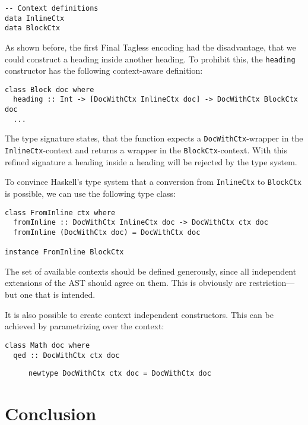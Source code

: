 \begin{lstlisting}
-- Context definitions
data InlineCtx
data BlockCtx
\end{lstlisting}

As shown before, the first Final Tagless encoding had the disadvantage, that we
could construct a heading inside another heading. To prohibit this, the
\texttt{heading} constructor has the following context-aware definition:

\begin{lstlisting}
class Block doc where
  heading :: Int -> [DocWithCtx InlineCtx doc] -> DocWithCtx BlockCtx doc
  ...
\end{lstlisting}

The type signature states, that the function expects a
\texttt{DocWithCtx}-wrapper in the \texttt{InlineCtx}-context and returns a
wrapper in the \texttt{BlockCtx}-context. With this refined signature a heading
inside a heading will be rejected by the type system.

To convince Haskell’s type system that a conversion from \texttt{InlineCtx} to
\texttt{BlockCtx} is possible, we can use the following type class:

\begin{lstlisting}
class FromInline ctx where
  fromInline :: DocWithCtx InlineCtx doc -> DocWithCtx ctx doc
  fromInline (DocWithCtx doc) = DocWithCtx doc

instance FromInline BlockCtx
\end{lstlisting}


The set of available contexts should be defined generously, since all
independent extensions of the AST should agree on them. This is obviously are
restriction—but one that is intended.

It is also possible to create context independent constructors. This can be
achieved by parametrizing over the context:

\begin{lstlisting}
class Math doc where
  qed :: DocWithCtx ctx doc
\end{lstlisting}

\begin{figure}[t]
\begin{lstlisting}
newtype DocWithCtx ctx doc = DocWithCtx doc
\end{lstlisting}
\end{figure}

\section{Conclusion}

